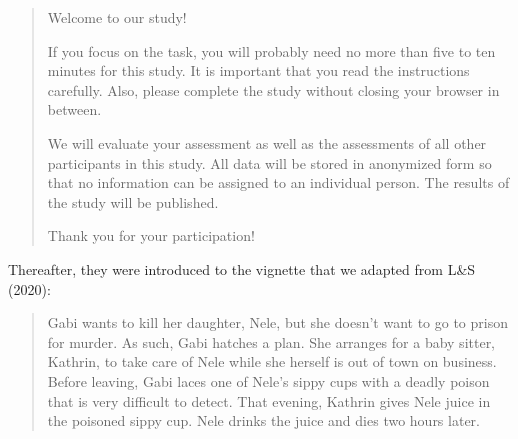 \documentclass[egregdoesnotlikesansseriftitles,12pt]{scrartcl}
\begin{document}
\begin{quote}
   Welcome to our study!%
	
   If you focus on the task, you will probably need no more than five to ten minutes for this study. It is important that you read the instructions carefully. Also, please complete the study without closing your browser in between.%

   We will evaluate your assessment as well as the assessments of all other participants in this study. All data will be stored in anonymized form so that no information can be assigned to an individual person. The results of the study will be published.%

   Thank you for your participation!%
\end{quote}

Thereafter, they were introduced to the vignette that we adapted from L\&S (2020):

\begin{quote}
   Gabi wants to kill her daughter, Nele, but she doesn't want to go to prison for murder. As such, Gabi hatches a plan. She arranges for a baby sitter, Kathrin, to take care of Nele while she herself is out of town on business. Before leaving, Gabi laces one of Nele's sippy cups with a deadly poison that is very difficult to detect. That evening, Kathrin gives Nele juice in the poisoned sippy cup. Nele drinks the juice and dies two hours later.%
\end{quote}
\end{document}
